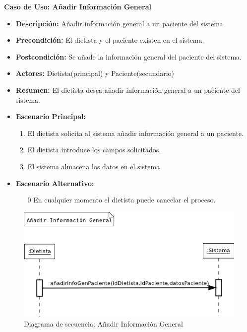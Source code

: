 \textbf{Caso de Uso: Añadir Información General}
\begin{itemize}
\item \textbf{Descripción:} Añadir información general a un paciente del sistema.
\item \textbf{Precondición:} El dietista y el paciente existen en el sistema.
\item \textbf{Postcondición:} Se añade la información general del paciente del sistema.
\item \textbf{Actores:} Dietista(principal) y Paciente(secundario)
\item \textbf{Resumen:} El dietista desea añadir información general a un paciente del sistema.
\item \textbf{Escenario Principal:}
\begin{enumerate}
\item El dietista solicita al sistema añadir información general a un paciente.
\item El dietista introduce los campos solicitados.
\item El sistema almacena los datos en el sistema.
\end{enumerate}
\item \textbf{Escenario Alternativo:}
\begin{enumerate}
\item[0] En cualquier momento el dietista puede cancelar el proceso.
\end{enumerate}
\end{itemize}
\begin{figure}[H]
  \label{ds_anadirinfogen}
  \begin{center}
    \includegraphics[scale=0.7]{../img/DS_AnadirInfoGen.png}
  \end{center}
  \caption{Diagrama de secuencia: Añadir Información General}
\end{figure}

